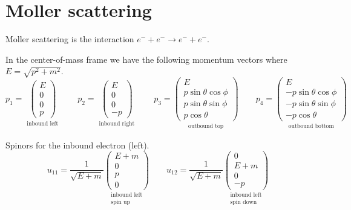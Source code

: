 

\section*{Moller scattering}

Moller scattering is the interaction $e^-+e^-\rightarrow e^-+e^-$.
%
\begin{center}
\end{center}
%
In the center-of-mass frame we have the following momentum vectors where $E=\sqrt{p^2+m^2}$.
\begin{equation*}
p_1=\underset{\substack{\text{inbound left}}}
{\begin{pmatrix}E\\0\\0\\p\end{pmatrix}}
\qquad
p_2=\underset{\substack{\text{inbound right}}}
{\begin{pmatrix}E\\0\\0\\-p\end{pmatrix}}
\qquad
p_3=\underset{\substack{\text{outbound top}}}
{\begin{pmatrix}
E\\
p\sin\theta\cos\phi\\
p\sin\theta\sin\phi\\
p\cos\theta
\end{pmatrix}}
\qquad
p_4=\underset{\substack{\text{outbound bottom}}}
{\begin{pmatrix}
E\\
-p\sin\theta\cos\phi\\
-p\sin\theta\sin\phi\\
-p\cos\theta
\end{pmatrix}}
\end{equation*}

Spinors for the inbound electron (left).
\begin{equation*}
u_{11}=\frac{1}{\sqrt{E+m}}
\underset{\substack{\text{inbound left}\\ \text{spin up}}}
{\begin{pmatrix}E+m\\0\\p\\0\end{pmatrix}}
\qquad
u_{12}=\frac{1}{\sqrt{E+m}}
\underset{\substack{\text{inbound left}\\ \text{spin down}}}
{\begin{pmatrix}0\\E+m\\0\\-p\end{pmatrix}}
\end{equation*}

